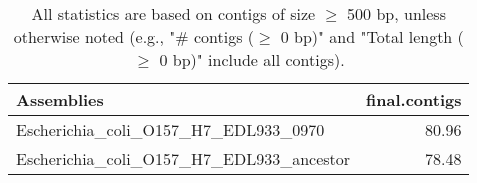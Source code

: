 \documentclass[12pt,a4paper]{article}
\begin{document}
\begin{table}[ht]
\begin{center}
\caption{All statistics are based on contigs of size $\geq$ 500 bp, unless otherwise noted (e.g., "\# contigs ($\geq$ 0 bp)" and "Total length ($\geq$ 0 bp)" include all contigs).}
\begin{tabular}{|l*{1}{|r}|}
\hline
Assemblies & final.contigs \\ \hline
Escherichia\_coli\_O157\_H7\_EDL933\_0970 & 80.96 \\ \hline
Escherichia\_coli\_O157\_H7\_EDL933\_ancestor & 78.48 \\ \hline
\end{tabular}
\end{center}
\end{table}
\end{document}
